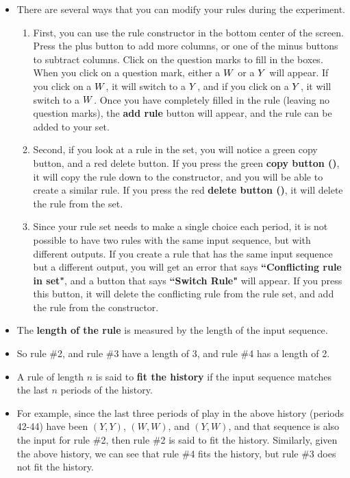 \documentclass[11pt]{article}
\newcommand{\dblbkt}[1]{}
\begin{document}
\begin{itemize}
\item There are several ways that you can modify your rules during the experiment.  
\begin{enumerate} 
\item \dblbkt{1}First, you can use the rule constructor in the bottom center of the screen. \dblbkt{1}Press the plus button to add more columns, \dblbkt{1}or one of the minus buttons to subtract columns.  Click on the question marks to fill in the boxes.  When you click on a question mark, \dblbkt{1}either a $W$ or a $Y$ will appear.  If you click on a $W$, \dblbkt{1}it will switch to a $Y$, and if you click on a $Y$, \dblbkt{1}it will switch to a $W$.  \dblbkt{1}Once you have completely filled in the rule (leaving no question marks), \dblbkt{1}the {\bf add rule} button will appear, \dblbkt{1}and the rule can be added to your set. 
\item Second, if you look at a rule in the set, \dblbkt{1}you will notice a green copy button, \dblbkt{1}and a red delete button.  If you \dblbkt{1}press the green {\bf copy button ()}, it will copy the rule down to the constructor, \dblbkt{1}and you will be able to create a similar rule.\dblbkt{slnc 2000} If you \dblbkt{1}press the red {\bf delete button ()}, it will delete the rule from the \dblbkt{1}set. \dblbkt{slnc 2000}
\item Since your rule set needs to make a single choice each period, it is not possible to have two rules with the same input sequence, but with different outputs.  \dblbkt{1}If you create a rule that has the same input sequence but a different output, you will get an error that \dblbkt{1}says {\bf ``Conflicting rule in set"}, and a \dblbkt{1}button that says {\bf ``Switch Rule"} will appear.  If you press this button, it will delete the \dblbkt{1}conflicting rule from the rule set, \dblbkt{1}and add the rule from the \dblbkt{1} constructor.  \dblbkt{slnc 2000}
\end{enumerate} 

\item The {\bf length of the rule} is measured by the length of the input sequence. 
\item So \dblbkt{1}rule \#2, and \dblbkt{1}rule \#3 have a length of 3, and \dblbkt{1}rule \#4 has a length of 2. 

\item A rule of length $n$ is said to {\bf fit the history} if the input sequence matches the last $n$ periods of the history. 
\item For example, since the last three periods of play in the above history \dblbkt{1}(periods 42-44) have been \dblbkt{1}$ \left( Y , Y \right)$, \dblbkt{1}$\left( W, W \right)$, and \dblbkt{1}$\left( Y , W \right) $, and that sequence is also the input for \dblbkt{1}rule \#2, \dblbkt{slnc 1000}then rule \#2 is said to fit the history.
Similarly, given the above history, we can see that \dblbkt{1}rule \#4 fits the history, \dblbkt{slnc 1000} but \dblbkt{1} rule \#3 does not fit the history.  


\end{itemize}
\end{document}
